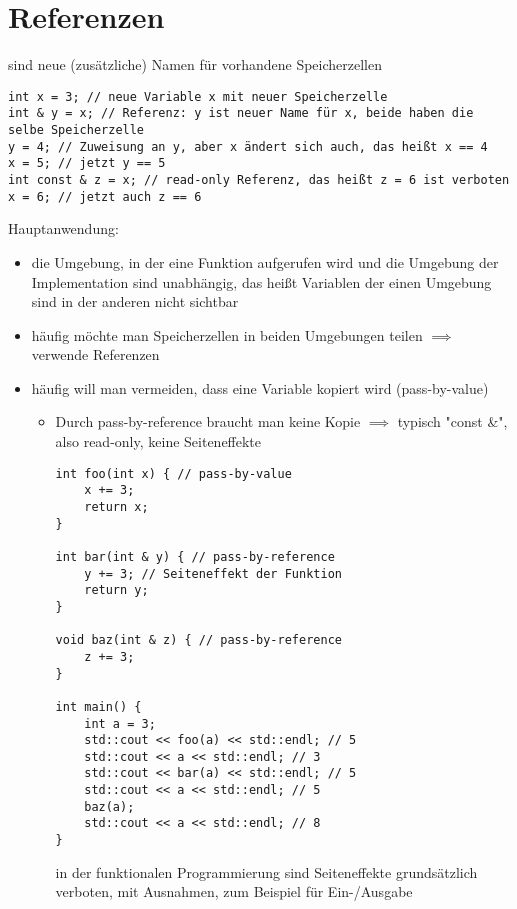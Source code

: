 \documentclass[a4paper]{scrartcl}
\theoremstyle{definition}
\theoremstyle{plain}
\theoremstyle{remark}
\theoremstyle{remark}
\begin{document}
\section{Referenzen}
\label{sec-10}
sind neue (zusätzliche) Namen für vorhandene Speicherzellen
\begin{verbatim}
int x = 3; // neue Variable x mit neuer Speicherzelle
int & y = x; // Referenz: y ist neuer Name für x, beide haben die selbe Speicherzelle
y = 4; // Zuweisung an y, aber x ändert sich auch, das heißt x == 4
x = 5; // jetzt y == 5
int const & z = x; // read-only Referenz, das heißt z = 6 ist verboten
x = 6; // jetzt auch z == 6
\end{verbatim}
Hauptanwendung:
\begin{itemize}
\item die Umgebung, in der eine Funktion aufgerufen wird und die Umgebung der Implementation sind unabhängig, das heißt Variablen der einen Umgebung sind in der anderen nicht sichtbar
\item häufig möchte man Speicherzellen in beiden Umgebungen teilen $\implies$ verwende Referenzen
\item häufig will man vermeiden, dass eine Variable kopiert wird (pass-by-value)
\begin{itemize}
\item Durch pass-by-reference braucht man keine Kopie $\implies$ typisch "const \&", also read-only, keine Seiteneffekte
\begin{verbatim}
int foo(int x) { // pass-by-value
	x += 3;
	return x;
}

int bar(int & y) { // pass-by-reference
	y += 3; // Seiteneffekt der Funktion
	return y;
}

void baz(int & z) { // pass-by-reference
	z += 3;
}

int main() {
	int a = 3;
	std::cout << foo(a) << std::endl; // 5
	std::cout << a << std::endl; // 3
	std::cout << bar(a) << std::endl; // 5
	std::cout << a << std::endl; // 5
	baz(a);
	std::cout << a << std::endl; // 8
}
\end{verbatim}
in der funktionalen Programmierung sind Seiteneffekte grundsätzlich verboten, 
mit Ausnahmen, zum Beispiel für Ein-/Ausgabe
\end{itemize}
\end{itemize}
\end{document}
